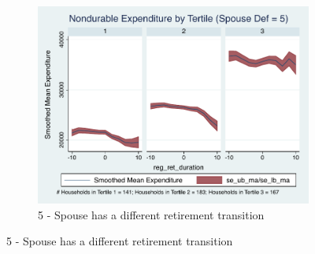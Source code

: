 \documentclass[11pt,onecolumn]{article}
\numberwithin{figure}{section}
\begin{document}
\begin{figure}
\begin{subfigure}{1.0\textwidth}
	\caption{5 - Spouse has a different retirement transition}
	\centering
	\includegraphics[width=0.8\linewidth]{../ConsumptionPostRetirement_by_SpouseDef/Smoothed/spouse_def_5.pdf}
	\end{subfigure}
	\vspace{1cm}
	

\end{figure}
\end{document}
